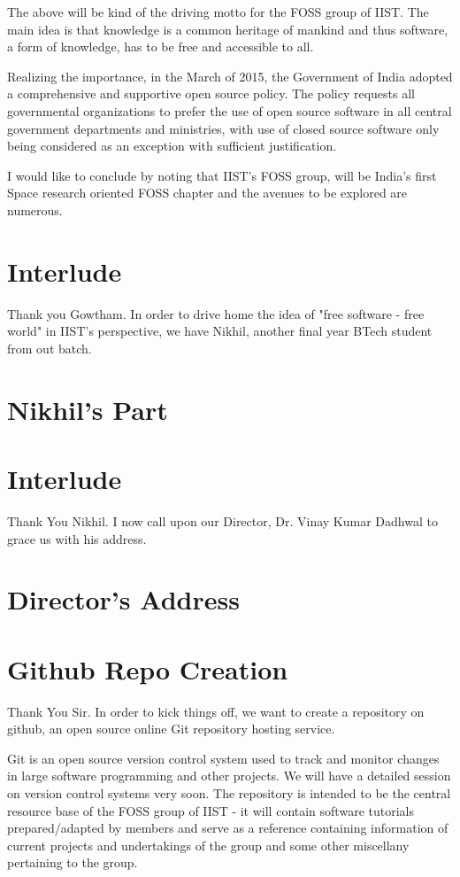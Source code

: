 \documentclass[11pt]{article}
\begin{document}
The above will be kind of the driving motto for the FOSS group of
  IIST. The main idea is that knowledge is a common heritage of 
  mankind and thus software, a form of knowledge, has to be free and
  accessible to all.

Realizing the importance, in the March of 2015, the Government of
India adopted a comprehensive and supportive open source
policy. The policy requests all governmental organizations to
prefer the use of open source software in all central government
departments and ministries, with use of closed source software
only being considered as an exception with sufficient
justification.

I would like to conclude by noting that IIST's FOSS group, will be
India's first Space research oriented FOSS chapter and the avenues
to be explored are numerous.

\section{Interlude}
\label{sec-3}
Thank you Gowtham. In order to drive home the idea of "free
software - free world" in IIST's perspective, we have Nikhil,
another final year BTech student from out batch.

\section{Nikhil's Part}
\label{sec-4}

\section{Interlude}
\label{sec-5}
Thank You Nikhil. I now call upon our Director, Dr. Vinay Kumar
Dadhwal to grace us with his address.

\section{Director's Address}
\label{sec-6}

\section{Github Repo Creation}
\label{sec-7}
Thank You Sir. In order to kick things off, we want to create a
repository on github, an open source online Git repository hosting
service. 

Git is an open source version control system used to track and
monitor changes in large software programming and other projects. We
will have a detailed session on version control systems very
soon. The repository is intended to be the central resource base of
the FOSS group of IIST - it will contain software tutorials
prepared/adapted by members and serve as a reference containing
information of current projects and undertakings of the group and
some other miscellany pertaining to the group.
\end{document}
